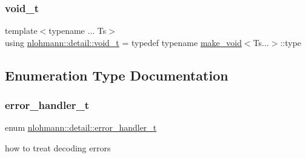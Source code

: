 \mbox{\label{namespacenlohmann_1_1detail_a92a167c49c6697b6ffe4f79492c705e5}} 
\subsubsection{\texorpdfstring{void\_t}{void\_t}}
{\footnotesize\ttfamily template$<$typename ... Ts$>$ \\
using \mbox{\hyperlink{namespacenlohmann_1_1detail_a92a167c49c6697b6ffe4f79492c705e5}{nlohmann\+::detail\+::void\+\_\+t}} = typedef typename \mbox{\hyperlink{structnlohmann_1_1detail_1_1make__void}{make\+\_\+void}}$<$Ts...$>$\+::type}



\subsection{Enumeration Type Documentation}
\mbox{\label{namespacenlohmann_1_1detail_a5a76b60b26dc8c47256a996d18d967df}} 
\subsubsection{\texorpdfstring{error\_handler\_t}{error\_handler\_t}}
{\footnotesize\ttfamily enum \mbox{\hyperlink{namespacenlohmann_1_1detail_a5a76b60b26dc8c47256a996d18d967df}{nlohmann\+::detail\+::error\+\_\+handler\+\_\+t}}\hspace{0.3cm}{\ttfamily [strong]}}



how to treat decoding errors 

